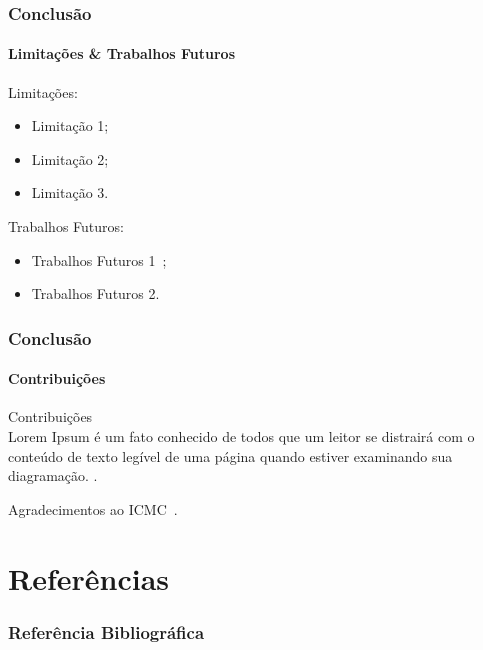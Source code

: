 \documentclass{beamer}
\begin{document}
    \begin{frame}
      \frametitle{Conclusão}
      \framesubtitle{Limitações \& Trabalhos Futuros}
      
      Limitações:
      \begin{itemize}
        \item Limitação 1;
        \item Limitação 2;
        \item Limitação 3.
      \end{itemize}
      
      \bigskip
      
      Trabalhos Futuros:
      \begin{itemize}
        \item Trabalhos Futuros 1~\cite{knuth-fa};
        \item Trabalhos Futuros 2.
      \end{itemize}
    \end{frame}
    
    
    \begin{frame}
      \frametitle{Conclusão}
      \framesubtitle{Contribuições}
        Contribuições\\
        Lorem Ipsum é um fato conhecido de todos que um leitor se distrairá com o conteúdo de texto legível de uma página quando estiver examinando sua diagramação.
        \cite{latexcompanion}.
        
        Agradecimentos ao ICMC~\cite{icmc}.
    \end{frame}
    
    \section{Referências}
    
    \begin{frame}[allowframebreaks]
      \frametitle{Referência Bibliográfica}
      
      
      
    \end{frame}
    
    
    
\end{document}
